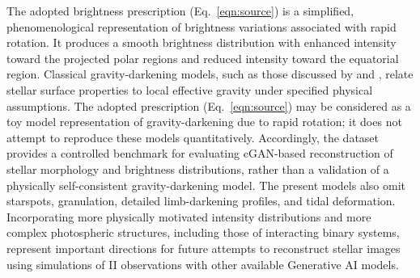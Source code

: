 {The adopted brightness prescription (Eq.~\ref{eqn:source}) is a simplified, phenomenological representation of brightness variations associated with rapid rotation. It produces a smooth brightness distribution with enhanced intensity toward the projected polar regions and reduced intensity toward the equatorial region. Classical gravity-darkening models, such as those discussed by \cite{von1924radiative} and \cite{lucy1967gravity}, relate stellar surface properties to local effective gravity under specified physical assumptions. The adopted prescription (Eq.~\ref{eqn:source}) may be considered as a toy model representation of gravity-darkening due to rapid rotation; it does not attempt to reproduce these models quantitatively. Accordingly, the dataset provides a controlled benchmark for evaluating cGAN-based reconstruction of stellar morphology and brightness distributions, rather than a validation of a physically self-consistent gravity-darkening model. The present models also omit starspots, granulation, detailed limb-darkening profiles, and tidal deformation. Incorporating more physically motivated intensity distributions and more complex photospheric structures, including those of interacting binary systems, represent important directions for future attempts to reconstruct stellar images using simulations of II observations with other available Generative AI models.}

